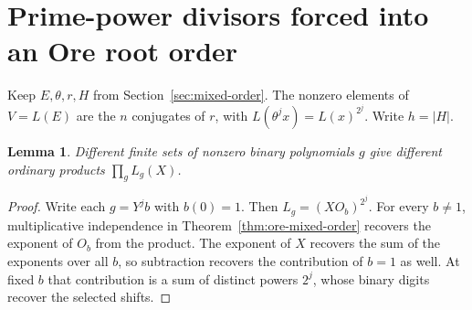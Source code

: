 \documentclass[11pt]{article}
\newtheorem{lemma}[theorem]{Lemma}
\begin{document}
\section{Prime-power divisors forced into an Ore root order}\label{sec:ore-primitive-part}
Keep \(E,\theta,r,H\) from Section~\ref{sec:mixed-order}. The nonzero
elements of \(V=L(E)\) are the \(n\) conjugates of \(r\), with
\(L(\theta^j x)=L(x)^{2^j}\). Write \(h=|H|\).

\begin{lemma}\label{lem:ore-subset-products}
Different finite sets of nonzero binary polynomials \(g\) give
different ordinary products \(\prod_g L_g(X)\).
\end{lemma}
\begin{proof}
Write each \(g=Y^j b\) with \(b(0)=1\). Then
\(L_g=(X O_b)^{2^j}\). For every \(b\ne1\), multiplicative
independence in Theorem~\ref{thm:ore-mixed-order} recovers
the exponent of \(O_b\) from the product. The exponent of \(X\)
recovers the sum of the exponents over all \(b\), so subtraction
recovers the contribution of \(b=1\) as well. At fixed \(b\) that
contribution is a sum of distinct powers \(2^j\), whose binary
digits recover the selected shifts.
\end{proof}
\end{document}
